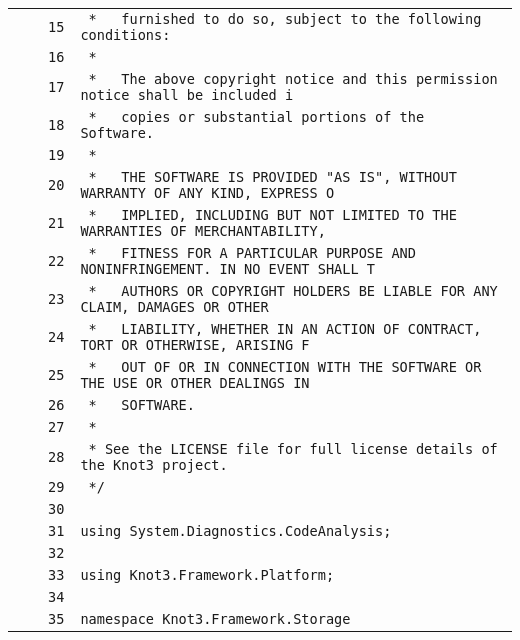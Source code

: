 \documentclass[a4paper,10pt]{article}
\begin{document}
\begin{longtable}[l]{lrrl}
\cellcolor{gray} &  & \verb~15~ & \verb~ *   furnished to do so, subject to the following conditions:~\\
\cellcolor{gray} &  & \verb~16~ & \verb~ *~\\
\cellcolor{gray} &  & \verb~17~ & \verb~ *   The above copyright notice and this permission notice shall be included i~\\
\cellcolor{gray} &  & \verb~18~ & \verb~ *   copies or substantial portions of the Software.~\\
\cellcolor{gray} &  & \verb~19~ & \verb~ *~\\
\cellcolor{gray} &  & \verb~20~ & \verb~ *   THE SOFTWARE IS PROVIDED "AS IS", WITHOUT WARRANTY OF ANY KIND, EXPRESS O~\\
\cellcolor{gray} &  & \verb~21~ & \verb~ *   IMPLIED, INCLUDING BUT NOT LIMITED TO THE WARRANTIES OF MERCHANTABILITY,~\\
\cellcolor{gray} &  & \verb~22~ & \verb~ *   FITNESS FOR A PARTICULAR PURPOSE AND NONINFRINGEMENT. IN NO EVENT SHALL T~\\
\cellcolor{gray} &  & \verb~23~ & \verb~ *   AUTHORS OR COPYRIGHT HOLDERS BE LIABLE FOR ANY CLAIM, DAMAGES OR OTHER~\\
\cellcolor{gray} &  & \verb~24~ & \verb~ *   LIABILITY, WHETHER IN AN ACTION OF CONTRACT, TORT OR OTHERWISE, ARISING F~\\
\cellcolor{gray} &  & \verb~25~ & \verb~ *   OUT OF OR IN CONNECTION WITH THE SOFTWARE OR THE USE OR OTHER DEALINGS IN~\\
\cellcolor{gray} &  & \verb~26~ & \verb~ *   SOFTWARE.~\\
\cellcolor{gray} &  & \verb~27~ & \verb~ *~\\
\cellcolor{gray} &  & \verb~28~ & \verb~ * See the LICENSE file for full license details of the Knot3 project.~\\
\cellcolor{gray} &  & \verb~29~ & \verb~ */~\\
\cellcolor{gray} &  & \verb~30~ & \verb~~\\
\cellcolor{gray} &  & \verb~31~ & \verb~using System.Diagnostics.CodeAnalysis;~\\
\cellcolor{gray} &  & \verb~32~ & \verb~~\\
\cellcolor{gray} &  & \verb~33~ & \verb~using Knot3.Framework.Platform;~\\
\cellcolor{gray} &  & \verb~34~ & \verb~~\\
\cellcolor{gray} &  & \verb~35~ & \verb~namespace Knot3.Framework.Storage~\\

\end{longtable}
\end{document}
